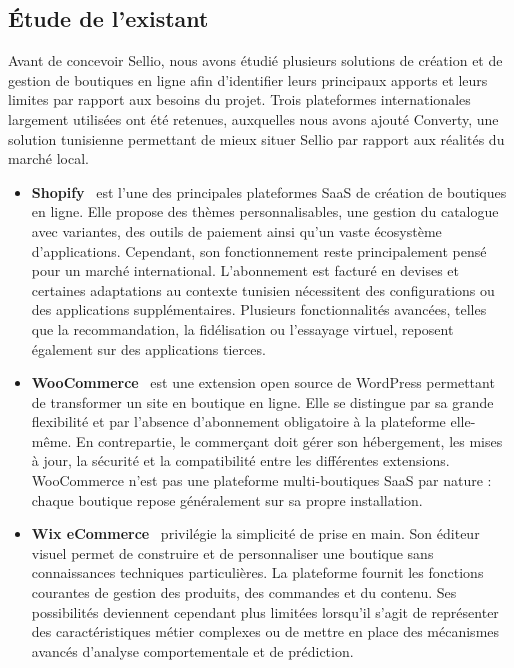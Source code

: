 \subsection{Étude de l'existant}

Avant de concevoir Sellio, nous avons étudié plusieurs solutions de création et de gestion
de boutiques en ligne afin d'identifier leurs principaux apports et leurs limites par rapport
aux besoins du projet. Trois plateformes internationales largement utilisées ont été retenues,
auxquelles nous avons ajouté Converty, une solution tunisienne permettant de mieux
situer Sellio par rapport aux réalités du marché local.

\begin{itemize}

\item \textbf{Shopify}~\cite{Shopify2026} est l'une des principales plateformes SaaS
de création de boutiques en ligne. Elle propose des thèmes personnalisables, une gestion
du catalogue avec variantes, des outils de paiement ainsi qu'un vaste écosystème
d'applications. Cependant, son fonctionnement reste principalement pensé pour un marché
international. L'abonnement est facturé en devises et certaines adaptations au contexte
tunisien nécessitent des configurations ou des applications supplémentaires. Plusieurs
fonctionnalités avancées, telles que la recommandation, la fidélisation ou l'essayage
virtuel, reposent également sur des applications tierces.

\item \textbf{WooCommerce}~\cite{WooCommerce2026} est une extension open source
de WordPress permettant de transformer un site en boutique en ligne. Elle se distingue
par sa grande flexibilité et par l'absence d'abonnement obligatoire à la plateforme
elle-même. En contrepartie, le commerçant doit gérer son hébergement, les mises à jour,
la sécurité et la compatibilité entre les différentes extensions. WooCommerce n'est pas
une plateforme multi-boutiques SaaS par nature : chaque boutique repose généralement
sur sa propre installation.

\item \textbf{Wix eCommerce}~\cite{Wix2026} privilégie la simplicité de prise en main.
Son éditeur visuel permet de construire et de personnaliser une boutique sans connaissances
techniques particulières. La plateforme fournit les fonctions courantes de gestion des
produits, des commandes et du contenu. Ses possibilités deviennent cependant plus
limitées lorsqu'il s'agit de représenter des caractéristiques métier complexes ou de mettre
en place des mécanismes avancés d'analyse comportementale et de prédiction.


\end{itemize}
